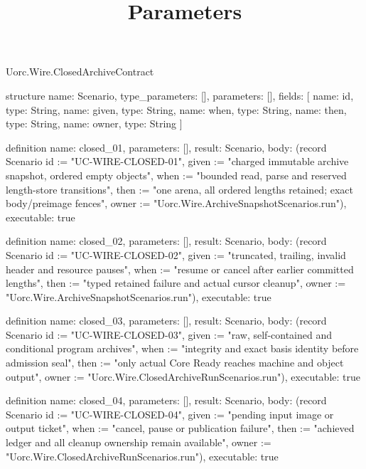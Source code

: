 \begin{lexlean}{Uorc.Wire.ClosedArchiveContract}
\title{Parameters}
\begin{semanticmodule}
structure{
  name: Scenario,
  type_parameters: [],
  parameters: [],
  fields: [
    {name: id, type: String},
    {name: given, type: String},
    {name: when, type: String},
    {name: then, type: String},
    {name: owner, type: String}
  ]
}

definition{
  name: closed_01,
  parameters: [],
  result: Scenario,
  body: (record Scenario {id := "UC-WIRE-CLOSED-01", given := "charged immutable archive snapshot, ordered empty objects", when := "bounded read, parse and reserved length-store transitions", then := "one arena, all ordered lengths retained; exact body/preimage fences", owner := "Uorc.Wire.ArchiveSnapshotScenarios.run"}),
  executable: true
}

definition{
  name: closed_02,
  parameters: [],
  result: Scenario,
  body: (record Scenario {id := "UC-WIRE-CLOSED-02", given := "truncated, trailing, invalid header and resource pauses", when := "resume or cancel after earlier committed lengths", then := "typed retained failure and actual cursor cleanup", owner := "Uorc.Wire.ArchiveSnapshotScenarios.run"}),
  executable: true
}

definition{
  name: closed_03,
  parameters: [],
  result: Scenario,
  body: (record Scenario {id := "UC-WIRE-CLOSED-03", given := "raw, self-contained and conditional program archives", when := "integrity and exact basis identity before admission seal", then := "only actual Core Ready reaches machine and object output", owner := "Uorc.Wire.ClosedArchiveRunScenarios.run"}),
  executable: true
}

definition{
  name: closed_04,
  parameters: [],
  result: Scenario,
  body: (record Scenario {id := "UC-WIRE-CLOSED-04", given := "pending input image or output ticket", when := "cancel, pause or publication failure", then := "achieved ledger and all cleanup ownership remain available", owner := "Uorc.Wire.ClosedArchiveRunScenarios.run"}),
  executable: true
}
\end{semanticmodule}
\end{lexlean}
